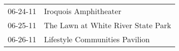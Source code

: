 \begin{supertabular}{p{0.25\columnwidth}p{0.75\columnwidth}}
 06-24-11 &               Iroquois Amphitheater \\
 06-25-11 &  The Lawn at White River State Park \\
 06-26-11 &      Lifestyle Communities Pavilion \\
\end{supertabular}

